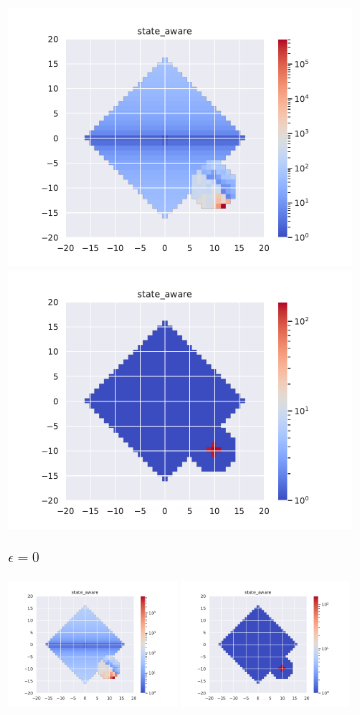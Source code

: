 \documentclass[runningheads]{llncs}
\begin{document}
\begin{figure}[H]
    \centering
    \begin{subfigure}[b]{\textwidth}
        \centering
        \includegraphics[width=0.49\linewidth]{img/epsilon/0/updates_state_aware.pdf}
        \includegraphics[width=0.49\linewidth]{img/epsilon/0/occupations_state_aware.pdf}
        \caption{$\epsilon=0$}
    \end{subfigure}
    \begin{subfigure}[b]{\textwidth}
        \centering
        \includegraphics[width=0.49\textwidth]{img/epsilon/1e-2/updates_state_aware.pdf}
        \includegraphics[width=0.49\textwidth]{img/epsilon/1e-2/occupations_state_aware.pdf}

\end{subfigure}
\end{figure}
\end{document}
